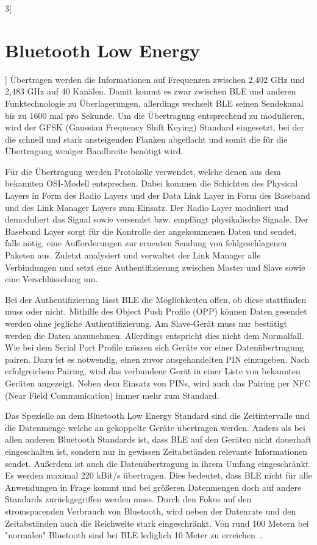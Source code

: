 \begin{multicols}{3}[\section{Bluetooth Low Energy}]
Übertragen werden die Informationen auf Frequenzen zwischen 2,402 GHz und 2,483 GHz auf 40 Kanälen. Damit kommt es zwar zwischen BLE und anderen Funktechnologie zu Überlagerungen, allerdings wechselt BLE seinen Sendekanal bis zu 1600 mal pro Sekunde.
Um die Übertragung entsprechend zu modulieren, wird der GFSK (Gaussian Frequency Shift Keying) Standard eingesetzt, bei der die schnell und stark ansteigenden Flanken abgeflacht und somit die für die Übertragung weniger Bandbreite benötigt wird.

Für die Übertragung werden Protokolle verwendet, welche denen aus dem bekannten OSI-Modell entsprechen. Dabei kommen die Schichten des Physical Layers in Form des Radio Layers und der Data Link Layer in Form des Baseband und des Link Manager Layers zum Einsatz. 
Der Radio Layer moduliert und demoduliert das Signal sowie versendet bzw. empfängt physikalische Signale. Der Baseband Layer sorgt für die Kontrolle der angekommenen Daten und sendet, falls nötig, eine Aufforderungen zur erneuten Sendung von fehlgeschlagenen Paketen aus. Zuletzt analysiert und verwaltet der Link Manager alle Verbindungen und setzt eine Authentifizierung zwischen Master und Slave sowie eine Verschlüsselung um.

Bei der Authentifizierung lässt BLE die Möglichkeiten offen, ob diese stattfinden muss oder nicht. Mithilfe des Object Push Profile (OPP) können Daten gesendet werden ohne jegliche Authentifizierung. Am Slave-Gerät muss nur bestätigt werden die Daten anzunehmen. Allerdings entspricht dies nicht dem Normalfall.
Wie bei dem Serial Port Profile müssen sich Geräte vor einer Datenübertragung pairen. Dazu ist es notwendig, einen zuvor ausgehandelten PIN einzugeben. Nach erfolgreichem Pairing, wird das verbundene Gerät in einer Liste von bekannten Geräten angezeigt. Neben dem Einsatz von PINs, wird auch das Pairing per NFC (Near Field Communication) immer mehr zum Standard.

Das Spezielle an dem Bluetooth Low Energy Standard sind die Zeitintervalle und die Datenmenge welche an gekoppelte Geräte übertragen werden. Anders als bei allen anderen Bluetooth Standards ist, dass BLE auf den Geräten nicht dauerhaft eingeschalten ist, sondern nur in gewissen Zeitabständen relevante Informationen sendet. Außerdem ist auch die Datenübertragung in ihrem Umfang eingeschränkt. Es werden maximal 220 kBit/s übertragen. Dies bedeutet, dass BLE nicht für alle Anwendungen in Frage kommt und bei größeren Datenmengen doch auf andere Standards zurückgegriffen werden muss. Durch den Fokus auf den stromsparenden Verbrauch von Bluetooth, wird neben der Datenrate und den Zeitabständen auch die Reichweite stark eingeschränkt. Von rund 100 Metern bei "normalen" Bluetooth sind bei BLE lediglich 10 Meter zu erreichen~\cite{BLE.1}.


\end{multicols}
